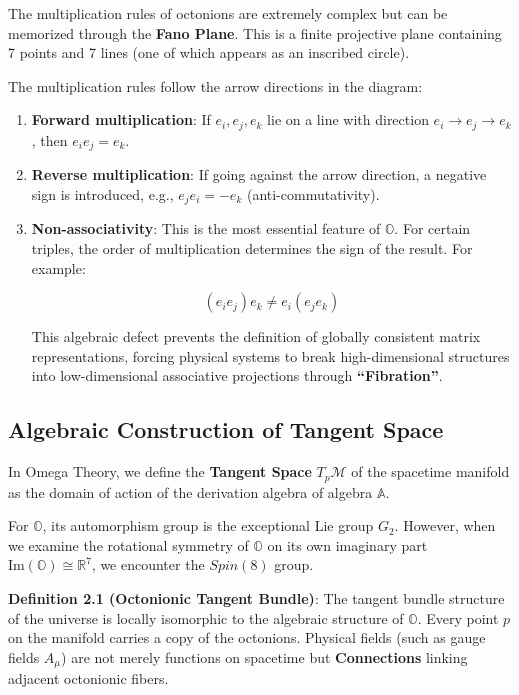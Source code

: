 The multiplication rules of octonions are extremely complex but can be memorized through the \textbf{Fano Plane}. This is a finite projective plane containing 7 points and 7 lines (one of which appears as an inscribed circle).

The multiplication rules follow the arrow directions in the diagram:

\begin{enumerate}
\item \textbf{Forward multiplication}: If $e_i, e_j, e_k$ lie on a line with direction $e_i \to e_j \to e_k$, then $e_i e_j = e_k$.
\item \textbf{Reverse multiplication}: If going against the arrow direction, a negative sign is introduced, e.g., $e_j e_i = -e_k$ (anti-commutativity).
\item \textbf{Non-associativity}: This is the most essential feature of $\mathbb{O}$. For certain triples, the order of multiplication determines the sign of the result. For example:

\[(e_i e_j) e_k \neq e_i (e_j e_k)\]

This algebraic defect prevents the definition of globally consistent matrix representations, forcing physical systems to break high-dimensional structures into low-dimensional associative projections through \textbf{``Fibration''}.
\end{enumerate}

\subsection{Algebraic Construction of Tangent Space}

In Omega Theory, we define the \textbf{Tangent Space} $T_p \mathcal{M}$ of the spacetime manifold as the domain of action of the derivation algebra of algebra $\mathbb{A}$.

For $\mathbb{O}$, its automorphism group is the exceptional Lie group $G_2$. However, when we examine the rotational symmetry of $\mathbb{O}$ on its own imaginary part $\text{Im}(\mathbb{O}) \cong \mathbb{R}^7$, we encounter the $Spin(8)$ group.

\textbf{Definition 2.1 (Octonionic Tangent Bundle)}:
The tangent bundle structure of the universe is locally isomorphic to the algebraic structure of $\mathbb{O}$. Every point $p$ on the manifold carries a copy of the octonions. Physical fields (such as gauge fields $A_\mu$) are not merely functions on spacetime but \textbf{Connections} linking adjacent octonionic fibers.

